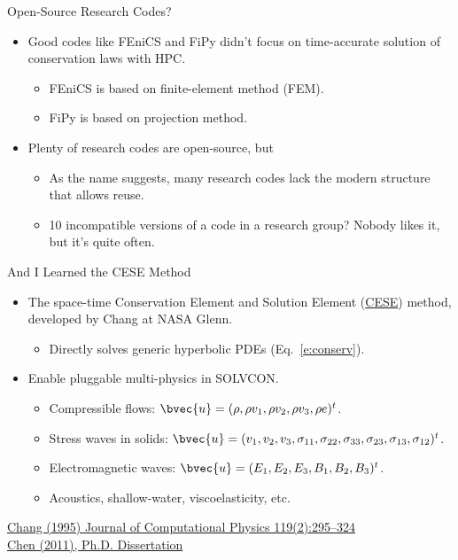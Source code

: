 \documentclass[dvips,xcolor=pst,14pt]{beamer}
\begin{document}
\begin{frame}{
%
Open-Source Research Codes?
%
}
\begin{itemize}
  \item Good codes like FEniCS and FiPy didn't focus on time-accurate solution
  of conservation laws with HPC.
  \begin{itemize}
    \item FEniCS is based on finite-element method (FEM).
    \item FiPy is based on projection method.
  \end{itemize}
  \item Plenty of research codes are open-source, but
  \begin{itemize}
    \item As the name suggests, many research codes lack the modern structure
    that allows reuse.
    \item 10 incompatible versions of a code in a research group?  Nobody likes
    it, but it's quite often.
  \end{itemize}
\end{itemize}
\end{frame}

\begin{frame}{
%
And I Learned the CESE Method
%
}
\begin{itemize}
  \item The space-time Conservation Element and Solution Element
  (\href{http://www.grc.nasa.gov/WWW/microbus/}{CESE}) method, developed by
  Chang at NASA Glenn.
  \begin{itemize}
    \item Directly solves generic hyperbolic PDEs (Eq.~\eqref{e:conserv}).
  \end{itemize}
  \item Enable pluggable multi-physics in SOLVCON.
  \begin{itemize}
    \item Compressible flows: $\bvec{u} = (\rho, \rho v_1, \rho v_2, \rho v_3,
    \rho e)^t$.
    \item Stress waves in solids: $\bvec{u} = (v_1, v_2, v_3, \sigma_{11},
    \sigma_{22}, \sigma_{33}, \sigma_{23}, \sigma_{13}, \sigma_{12})^t$.
    \item Electromagnetic waves: $\bvec{u} = (E_1, E_2, E_3, B_1, B_2, B_3)^t$.
    \item Acoustics, shallow-water, viscoelasticity, etc.
  \end{itemize}
\end{itemize}

\begin{flushright}\footnotesize
\href{http://dx.doi.org/10.1006/jcph.1995.1137}{Chang (1995) Journal of
Computational Physics 119(2):295--324} \\
\href{http://solvcon.net/yyc/publications.html}{Chen (2011), Ph.D. Dissertation}
\end{flushright}

\end{frame}
\end{document}
